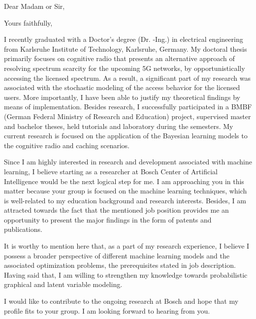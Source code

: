 \documentclass[12pt,a4paper,sans]{moderncv}        %
\begin{document}
\date{\today}
\opening{Dear Madam or Sir,}
\closing{Yours faithfully,}
\makelettertitle


I recently graduated with a Doctor’s degree (Dr. -Ing.) in electrical engineering from Karlsruhe Institute of Technology, Karlsruhe, Germany. My doctoral thesis primarily focuses on cognitive radio that presents an alternative approach of resolving spectrum scarcity for the upcoming 5G networks, by opportunistically accessing the licensed spectrum. As a result, a significant part of my research was associated with the stochastic modeling of the access behavior for the licensed users. More importantly, I have been able to justify my theoretical findings by means of implementation. Besides research, I successfully participated in a BMBF (German Federal Ministry of Research and Education) project, supervised master and bachelor theses, held tutorials and laboratory during the semesters. My current research is focused on the application of the Bayesian learning models to the cognitive radio and caching scenarios.

Since I am highly interested in research and development associated with machine learning, I believe starting as a researcher at Bosch Center of Artificial Intelligence would be the next logical step for me. I am approaching you in this matter because your group is focused on the machine learning techniques, which is well-related to my education background and research interests. Besides, I am attracted towards the fact that the mentioned job position provides me an opportunity to present the major findings in the form of patents and publications. 


It is worthy to mention here that, as a part of my research experience, I believe I possess a broader perspective of different machine learning models and the associated optimization problems, the prerequisites stated in job description. Having said that, I am willing to strengthen my knowledge towards probabilistic graphical and latent variable modeling.

I would like to contribute to the ongoing research at Bosch and hope that my profile fits to your group. I am looking forward to hearing from you.

\makeletterclosing
\end{document}
